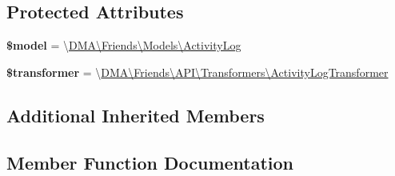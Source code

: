 \subsection*{Protected Attributes}
\begin{DoxyCompactItemize}
\item 
\hypertarget{classDMA_1_1Friends_1_1API_1_1Resources_1_1ActivityLogResource_ad0eb6db8bc19747e30a2b94658492680}{}{\bfseries \$model} = \textquotesingle{}\textbackslash{}\hyperlink{classDMA_1_1Friends_1_1Models_1_1ActivityLog}{D\+M\+A\textbackslash{}\+Friends\textbackslash{}\+Models\textbackslash{}\+Activity\+Log}\textquotesingle{}\label{classDMA_1_1Friends_1_1API_1_1Resources_1_1ActivityLogResource_ad0eb6db8bc19747e30a2b94658492680}

\item 
\hypertarget{classDMA_1_1Friends_1_1API_1_1Resources_1_1ActivityLogResource_a0e3565f8171750f0576c51bd8771f793}{}{\bfseries \$transformer} = \textquotesingle{}\textbackslash{}\hyperlink{classDMA_1_1Friends_1_1API_1_1Transformers_1_1ActivityLogTransformer}{D\+M\+A\textbackslash{}\+Friends\textbackslash{}\+A\+P\+I\textbackslash{}\+Transformers\textbackslash{}\+Activity\+Log\+Transformer}\textquotesingle{}\label{classDMA_1_1Friends_1_1API_1_1Resources_1_1ActivityLogResource_a0e3565f8171750f0576c51bd8771f793}

\end{DoxyCompactItemize}
\subsection*{Additional Inherited Members}


\subsection{Member Function Documentation}
\hypertarget{classDMA_1_1Friends_1_1API_1_1Resources_1_1ActivityLogResource_a34b4b73d1baf95a90e7337e32385fe07}{}
